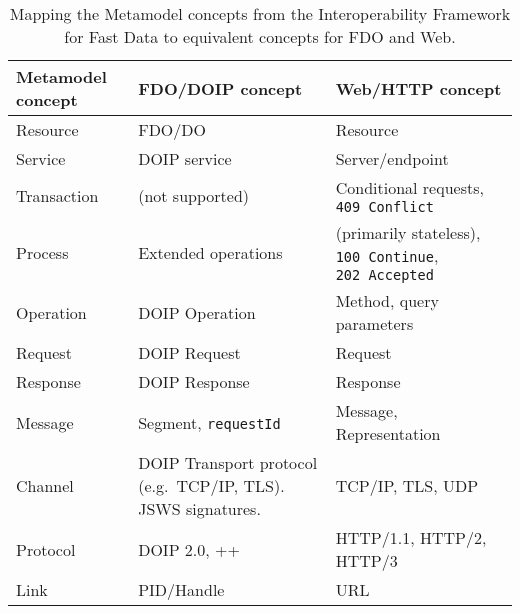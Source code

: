 \begin{table}[h!]
\centering
\caption{Mapping the Metamodel concepts from the Interoperability Framework for Fast Data \autocite{delgadoInteroperabilityFrameworkDistributed2016a} to equivalent concepts for FDO and Web.
\label{tbl:metamodel-concepts}}\tabularnewline
 \begin{tabular}{ m{5em}  m{15em} m{15em} } 
 \hline
Metamodel concept & 
FDO/DOIP concept & 
Web/HTTP concept \\ 
 \hline
Resource	  & FDO/DO	            & Resource \\
Service	    & DOIP service	      & Server/endpoint \\
Transaction	& (not supported)	    & Conditional requests, \texttt{409\ Conflict} \\
Process	    & Extended operations	& (primarily stateless), \texttt{100\ Continue}, \texttt{202\ Accepted} \\
Operation	  & DOIP Operation	    & Method, query parameters \\
Request	    & DOIP Request	      & Request \\
Response	  & DOIP Response	      & Response \\
Message	    & Segment, \texttt{requestId} 
                                  & Message, Representation \\
Channel	    & DOIP Transport protocol (e.g.~TCP/IP, TLS). JSWS signatures.
                                  & TCP/IP, TLS, UDP \\
Protocol  	& DOIP 2.0, ++	      & HTTP/1.1, HTTP/2, HTTP/3 \\
Link	      & PID/Handle	        & URL \\ 
 \hline
 \end{tabular}\end{table}
